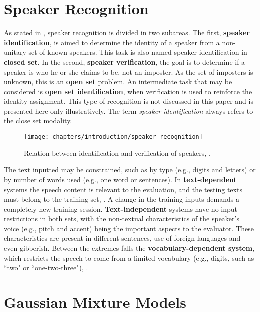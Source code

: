 \section{Speaker Recognition}
\label{sec:speaker-recognition}

As stated in , speaker recognition is divided in two subareas. The first, \textbf{speaker identification}, is aimed to determine the identity of a speaker from a non-unitary set of known speakers. This task is also named speaker identification in \textbf{closed set}. In the second, \textbf{speaker verification}, the goal is to determine if a speaker is who he or she claims to be, not an imposter. As the set of imposters is unknown, this is an \textbf{open set} problem. An intermediate task that may be considered is \textbf{open set identification}, when verification is used to reinforce the identity assignment. This type of recognition is not discussed in this paper and is presented here only illustratively. The term \emph{speaker identification} always refers to the close set modality.

\begin{figure}[ht]
    \centering
    \texttt{[image: chapters/introduction/speaker-recognition]}
    \caption{Relation between identification and verification of speakers, .}
    \label{fig:speaker-recognition}
\end{figure}

The text inputted may be constrained, such as by type (e.g., digits and letters) or by number of words used (e.g., one word or sentences). In \textbf{text-dependent} systems the speech content is relevant to the evaluation, and the testing texts must belong to the training set, . A change in the training inputs demands a completely new training session. \textbf{Text-independent} systems have no input restrictions in both sets, with the non-textual characteristics of the speaker's voice (e.g., pitch and accent) being the important aspects to the evaluator. These characteristics are present in different sentences, use of foreign languages and even gibberish. Between the extremes falls the \textbf{vocabulary-dependent system}, which restricts the speech to come from a limited vocabulary (e.g., digits, such as ``two" or ``one-two-three"), .

\section{Gaussian Mixture Models}
\label{sec:gmm}

